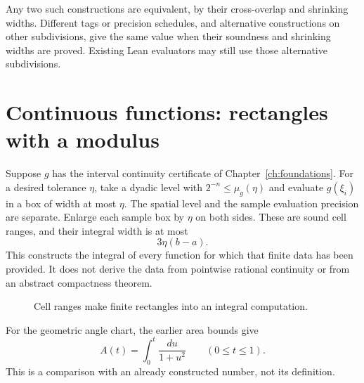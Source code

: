Any two such constructions are equivalent, by their cross-overlap and
shrinking widths.  Different tags or precision schedules, and alternative constructions on
other subdivisions, give the same value when their soundness and shrinking
widths are proved. Existing Lean evaluators may still use those alternative
subdivisions.

\section{Continuous functions: rectangles with a modulus}
Suppose $g$ has the interval continuity certificate of
Chapter~\ref{ch:foundations}. For a desired tolerance $\eta$, take a
dyadic level with $2^{-n}\le\mu_g(\eta)$ and evaluate $g(\xi_i)$ in a box
of width at most $\eta$. The spatial level and the sample evaluation
precision are separate.  Enlarge each sample box by $\eta$ on both sides.  These are sound
cell ranges, and their integral width is at most
\[
 3\eta(b-a).
\]
This constructs the integral of every function for which that finite data
has been provided.  It does not derive the data from pointwise rational
continuity or from an abstract compactness theorem.

\begin{figure}[htbp]\centering
\arctanRectangleEnclosureAnimation
\caption{Cell ranges make finite rectangles into an integral computation.}
\end{figure}

For the geometric angle chart, the earlier area bounds give
\[
 A(t)=\int_0^t\frac{du}{1+u^2}\qquad(0\le t\le1).
\]
This is a comparison with an already constructed number, not its definition.

